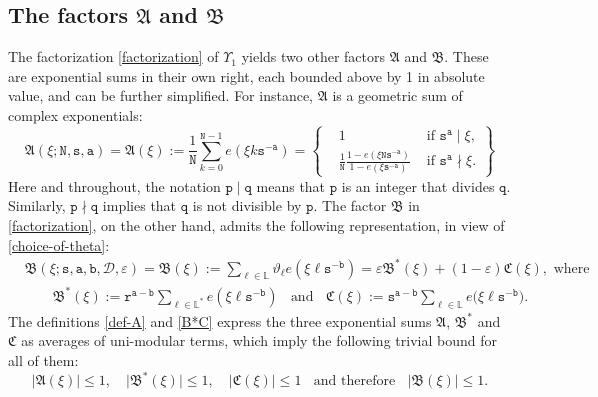 \documentclass[12pt, twoside]{article}
\theoremstyle{definition}
\numberwithin{equation}{section}
\begin{document}
\subsection{The factors $\mathfrak A$ and $\mathfrak B$} \label{A-and-B-section} 
The factorization \eqref{factorization} of $\Upsilon_1$ yields two other factors $\mathfrak A$ and $\mathfrak B$. These are exponential sums in their own right, each bounded above by 1 in absolute value, and can be further simplified. For instance, $\mathfrak A$ is a geometric sum of complex exponentials:  
\begin{equation} \label{def-A}
\mathfrak A(\xi; \mathtt N, \mathtt s, \mathtt a) = \mathfrak A(\xi)  :=  \frac{1}{\mathtt N} \sum_{k=0}^{\mathtt N -1}  e \left(\xi k \mathtt s^{-\mathtt a} \right)  = \left\{ \begin{aligned}  &1  &\text{ if } \mathtt s^{\mathtt a} \mid \xi, \\ &\frac{1}{\mathtt N}\frac{1 - e(\xi \mathtt N \mathtt s^{-\mathtt a})}{1 - e(\xi \mathtt s^{-\mathtt a})}  &  \text{ if } \mathtt s^{\mathtt a} \nmid \xi. \end{aligned} \right\}
\end{equation}
Here and throughout, the notation $\mathtt p \mid \mathtt q$ means that $\mathtt p$ is an integer that divides $\mathtt q$. Similarly, $\mathtt p \nmid \mathtt q$ implies that $\mathtt q$ is not divisible by $\mathtt p$. 
\vskip0.1in
\noindent The factor $\mathfrak B$ in \eqref{factorization}, on the other hand, admits the following representation, in view of \eqref{choice-of-theta}: 
 \begin{align}
&\mathfrak B(\xi; \mathtt s, \mathtt a, \mathtt b, \mathscr{D}, \varepsilon) = \mathfrak B (\xi) :=   \sum_{\ell \in \mathbb L} \vartheta_{\ell} e \left(\xi \ell \mathtt s^{-\mathtt b} \right)  = \varepsilon \mathfrak B^{\ast}(\xi) + (1 - \varepsilon) \mathfrak C(\xi), \text{ where } \label{def-B} \\ 
&\qquad\mathfrak B^{\ast}(\xi) := {\mathtt r}^{\mathtt a - \mathtt b} \sum_{\ell \in \mathbb L^{\ast}} e(\xi \ell \mathtt s^{-\mathtt b}) \; \; \text{ and } \; \; \mathfrak C(\xi) :=  \mathtt s^{\mathtt a - \mathtt b}  \sum_{\ell \in \mathbb L} e\bigl( \xi \ell \mathtt s^{-\mathtt b} \bigr).  \label{B*C}
\end{align}
 The definitions \eqref{def-A} and \eqref{B*C} express the three exponential sums $\mathfrak A$, $\mathfrak B^{\ast}$ and $\mathfrak C$ as averages of uni-modular terms, which imply the following trivial bound for all of them:
 \begin{equation} \label{B*C-trivial-bound}
\bigl|\mathfrak A(\xi) \bigr| \leq 1, \quad  \bigl|\mathfrak B^{\ast}(\xi) \bigr| \leq 1, \quad \bigl|\mathfrak C(\xi) \bigr| \leq 1 \; \; \text{ and therefore }  \; \;  \bigl|\mathfrak B(\xi) \bigr| \leq 1. 
\end{equation} 
\end{document}
